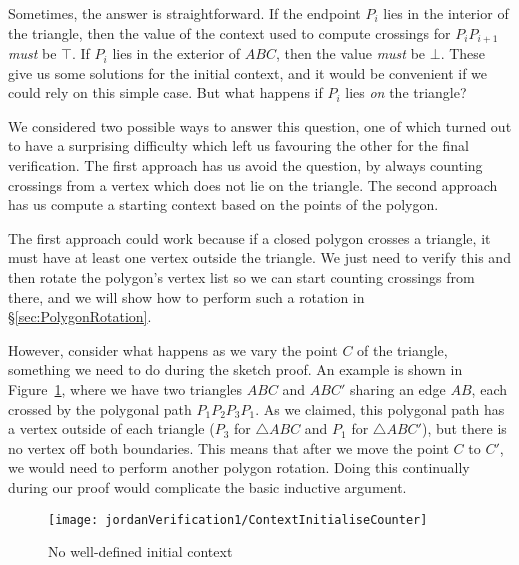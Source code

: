Sometimes, the answer is straightforward. If the endpoint $P_i$ lies in the interior of the triangle, then the value of the context used to compute crossings for $P_iP_{i+1}$ \emph{must} be $\top$. If $P_i$ lies in the exterior of $ABC$, then the value \emph{must} be $\bot$. These give us some solutions for the initial context, and it would be convenient if we could rely on this simple case. But what happens if $P_i$ lies \emph{on} the triangle?

We considered two possible ways to answer this question, one of which turned out to have a surprising difficulty which left us favouring the other for the final verification. The first approach has us avoid the question, by always counting crossings from a vertex which does not lie on the triangle. The second approach has us compute a starting context based on the points of the polygon.

The first approach could work because if a closed polygon crosses a triangle, it must have at least one vertex outside the triangle. We just need to verify this and then rotate the polygon's vertex list so we can start counting crossings from there, and we will show how to perform such a rotation in \S\ref{sec:PolygonRotation}.

However, consider what happens as we vary the point $C$ of the triangle, something we need to do during the sketch proof. An example is shown in Figure~\ref{fig:ContextInitialiseCounter}, where we have two triangles $ABC$ and $ABC'$ sharing an edge $AB$, each crossed by the polygonal path $P_1P_2P_3P_1$. As we claimed, this polygonal path has a vertex outside of each triangle ($P_3$ for $\triangle ABC$ and $P_1$ for $\triangle ABC'$), but there is no vertex off both boundaries. This means that after we move the point $C$ to $C'$, we would need to perform another polygon rotation. Doing this continually during our proof would complicate the basic inductive argument.

\begin{figure}
\centering\texttt{[image: jordanVerification1/ContextInitialiseCounter]}
\caption{No well-defined initial context}
\label{fig:ContextInitialiseCounter}
\end{figure}

